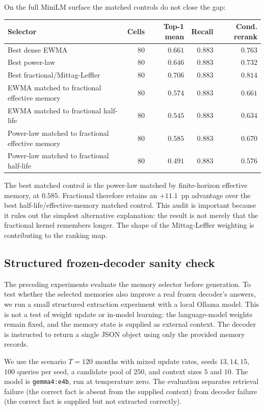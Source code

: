 \documentclass[11pt]{article}
\theoremstyle{plain}
\theoremstyle{definition}
\begin{document}
On the full MiniLM surface the matched controls do not
close the gap:
\begin{center}
\begin{tabular}{@{}lrrrr@{}}
\toprule
Selector & Cells & Top-1 mean & Recall & Cond. rerank \\
\midrule
Best dense EWMA & $80$ & $0.661$ & $0.883$ & $0.763$ \\
Best power-law & $80$ & $0.646$ & $0.883$ & $0.732$ \\
Best fractional/Mittag-Leffler & $80$ & $\mathbf{0.706}$ & $0.883$ & $0.814$ \\
EWMA matched to fractional effective memory & $80$ & $0.574$ & $0.883$ & $0.661$ \\
EWMA matched to fractional half-life & $80$ & $0.545$ & $0.883$ & $0.634$ \\
Power-law matched to fractional effective memory & $80$ & $0.585$ & $0.883$ & $0.670$ \\
Power-law matched to fractional half-life & $80$ & $0.491$ & $0.883$ & $0.576$ \\
\bottomrule
\end{tabular}
\end{center}

The best matched control is the power-law matched by
finite-horizon effective memory, at $0.585$.  Fractional
therefore retains an $+11.1$~pp advantage over the best
half-life/effective-memory matched control.  This audit
is important because it rules out the simplest alternative
explanation: the result is not merely that the fractional
kernel remembers longer.  The shape of the
Mittag-Leffler weighting is contributing to the ranking
map.

\subsection{Structured frozen-decoder sanity check}
\label{sec:ollama_decoder}

The preceding experiments evaluate the memory selector
before generation.  To test whether the selected memories
also improve a real frozen decoder's answers, we run a
small structured extraction experiment with a local
Ollama model.  This is not a test of weight update or
in-model learning: the language-model weights remain
fixed, and the memory state is supplied as external
context.  The decoder is instructed to return a single
JSON object using only the provided memory records.

We use the scenario $T=120$ months with mixed update
rates, seeds $13,14,15$, $100$ queries per seed, a
candidate pool of $250$, and context sizes $5$ and $10$.
The model is \texttt{gemma4:e4b}, run at temperature
zero.  The evaluation separates retrieval failure
(the correct fact is absent from the supplied context)
from decoder failure (the correct fact is supplied but
not extracted correctly).
\end{document}
